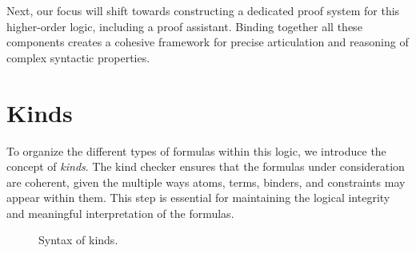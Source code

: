 \documentclass[english, mgr]{iithesis}
\renewcommand{\it}[1]{\textit{#1}}
\begin{document}
Next, our focus will shift towards constructing a dedicated proof system for this higher-order logic, including a proof assistant.
Binding together all these components creates a cohesive framework
for precise articulation and reasoning of complex syntactic properties.


\section{Kinds}
To organize the different types of formulas within this logic, we introduce the concept of \it{kinds}.
The kind checker ensures that the formulas under consideration are coherent, given the multiple ways atoms, terms, binders, and constraints may appear within them. This step is essential for maintaining the logical integrity and meaningful interpretation of the formulas.
\begin{figure}[htbp]
  \caption{Syntax of kinds.}
  \label{fig:kinds-grammar}
\end{figure}
\end{document}
